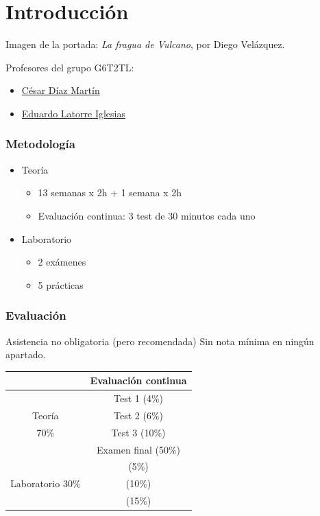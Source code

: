 \documentclass[a4paper]{book}
\begin{document}
\newpage
{}
{}
\section*{Introducción}
Imagen de la portada: \textsl{La fragua de Vulcano}, por Diego Velázquez.

Profesores del grupo G6T2TL:
\begin{itemize}
	 \item  \href{mailto:cesar.diazm@upm.es}{César Díaz Martín}
	 \item \href{mailto:eduardo.latorre.iglesias@upm.es}{Eduardo Latorre Iglesias}
\end{itemize}

\subsubsection{Metodología} \vspace{\parskip}
\begin{itemize}
	 \item Teoría
	 \begin{itemize}
		  \item 13 semanas x 2h + 1 semana x 2h
		  \item Evaluación continua: 3 test de 30 minutos cada uno
	 \end{itemize}
	 \item Laboratorio
	 \begin{itemize}
		  \item 2 exámenes
		  \item 5 prácticas
	 \end{itemize}
\end{itemize}

\subsubsection{Evaluación} \vspace{\parskip}
Asistencia no obligatoria (pero recomendada)
Sin nota mínima en ningún apartado.

\begingroup
\renewcommand{\arraystretch}{1.2}
\begin{center}
	\begin{tabular}{c | c }
		& Evaluación continua \\ \hline
		& Test 1 (4\%) \\
		Teoría & Test 2 (6\%) \\
		70\% & Test 3 (10\%) \\
		& Examen final (50\%) \\ \hline
		& (5\%)  \\
		Laboratorio 30\% & (10\%)  \\
		& (15\%) \\
	\end{tabular}
\end{center}
\endgroup
\end{document}
